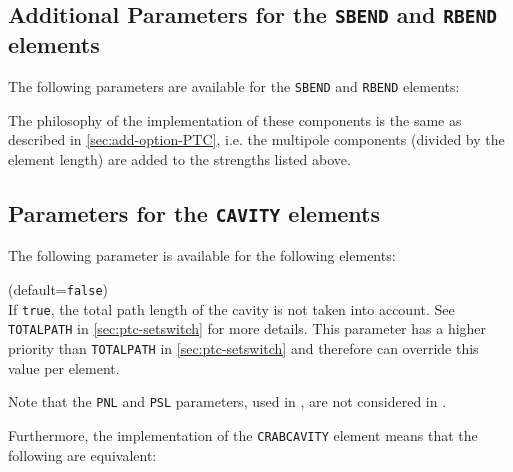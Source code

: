 \subsection{Additional Parameters for the \texttt{SBEND} and \texttt{RBEND} elements}

The following parameters are available for the \texttt{SBEND} and \texttt{RBEND} elements:


The philosophy of the implementation of these components is the same as described 
in \ref{sec:add-option-PTC}, i.e. the multipole components (divided by the element length) 
are added to the strengths listed above.


\subsection{Parameters for the \texttt{CAVITY} elements}

The following parameter is available for the following elements:

\begin{madlist}
   (default=\texttt{false}) \\
  If \texttt{true}, the total path length of the cavity is not taken into account.
  See \texttt{TOTALPATH} in \ref{sec:ptc-setswitch} for more details. This parameter
  has a higher priority than \texttt{TOTALPATH} in \ref{sec:ptc-setswitch} and therefore 
  can override this value per element.
\end{madlist}

Note that the \texttt{PNL} and \texttt{PSL} parameters, used in \madx, are not
considered in \ptc.

Furthermore, the implementation of the \texttt{CRABCAVITY} element means that 
the following are equivalent:

